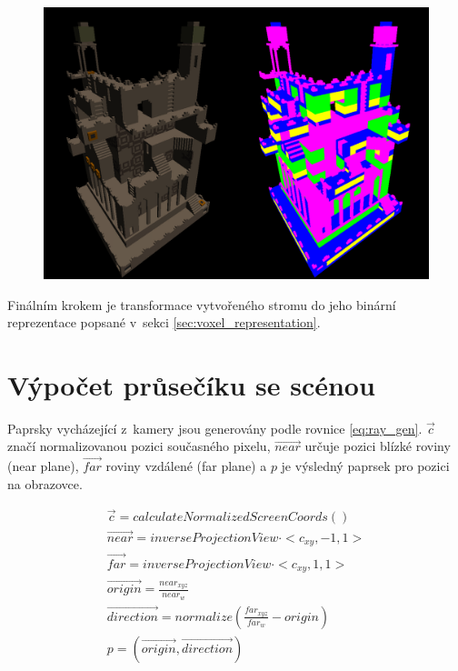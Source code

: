 \begin{figure}[H]
	\centering
	\includegraphics[scale=0.7]{obrazky-figures/levels_render.png}
	\captionsetup{justification=centering}
	\label{fig:imgui_classes}
\end{figure}



Finálním krokem je transformace vytvořeného stromu do jeho binární reprezentace popsané v~sekci \ref{sec:voxel_representation}.


\section{Výpočet průsečíku se scénou} \label{sec:bvh_traversal_impl}
Paprsky vycházející z~kamery jsou generovány podle rovnice \ref{eq:ray_gen}. $\vec{c}$ značí normalizovanou pozici současného pixelu, $\vec{near}$ určuje pozici blízké roviny (near plane), $\vec{far}$ roviny vzdálené (far plane) a $p$ je výsledný paprsek pro pozici na obrazovce.


\begin{equation} \label{eq:ray_gen}
	\begin{gathered}
	    \vec{c} = calculateNormalizedScreenCoords()\\
	    \vec{near} = inverseProjectionView \cdot <c_{xy}, -1, 1>\\
	    \vec{far} = inverseProjectionView \cdot <c_{xy}, 1, 1>\\
	    \vec{origin} = \frac{near_{xyz}}{near_w}\\
	    \vec{direction} = normalize(\frac{far_{xyz}}{far_w} - origin)\\
	    p = (\vec{origin}, \vec{direction})
	\end{gathered}
\end{equation}

